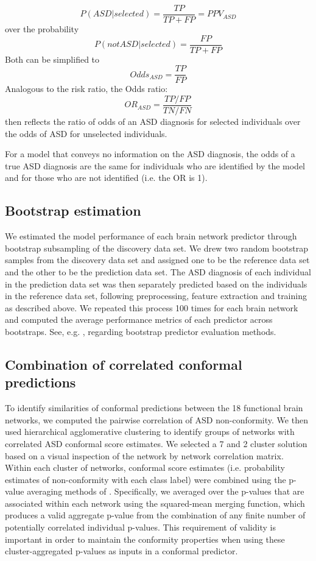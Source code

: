 \documentclass[9pt,lineno]{elife}
\begin{document}
\[P(ASD|selected) = \frac{TP}{TP+FP}=PPV_{ASD}\]
over the probability
\[P(not ASD|selected) = \frac{FP}{TP+FP}\]
Both can be simplified to
\[Odds_{ASD} = \frac{TP}{FP}\]
Analogous to the risk ratio, the Odds ratio:
\[OR_{ASD} = \frac{TP/FP}{TN/FN}\]
then reflects the ratio of odds of an ASD diagnosis for selected individuals over the odds of ASD for unselected individuals. 

For a model that conveys no information on the ASD diagnosis, the odds of a true ASD diagnosis are the same for individuals who are identified by the model and for those who are not identified (i.e. the OR is 1). 

\subsection{Bootstrap estimation}
We estimated the model performance of each brain network predictor through bootstrap subsampling of the discovery data set. We drew two random bootstrap samples from the discovery data set and assigned one to be the reference data set and the other to be the prediction data set. The ASD diagnosis of each individual in the prediction data set was then separately predicted based on the individuals in the reference data set, following preprocessing, feature extraction and training as described above. We repeated this process 100 times for each brain network and computed the average performance metrics of each predictor across bootstraps. See, e.g. \citep{Efron1983-ft}, regarding bootstrap predictor evaluation methods.


\subsection{Combination of correlated conformal predictions}
To identify similarities of conformal predictions between the 18 functional brain networks, we computed the pairwise correlation of ASD non-conformity. We then used hierarchical agglomerative clustering to identify groups of networks with correlated ASD conformal score estimates. We selected a 7 and 2 cluster solution based on a visual inspection of the network by network correlation matrix.
Within each cluster of networks, conformal score estimates (i.e. probability estimates of non-conformity with each class label) were combined using the p-value averaging methods of \citep{Vovk2012-of}. Specifically, we averaged over the p-values that are associated within each network using the squared-mean merging function, which produces a valid aggregate p-value from the combination of any finite number of potentially correlated individual p-values. This requirement of validity is important in order to maintain the conformity properties when using these cluster-aggregated p-values as inputs in a conformal predictor.
\end{document}
